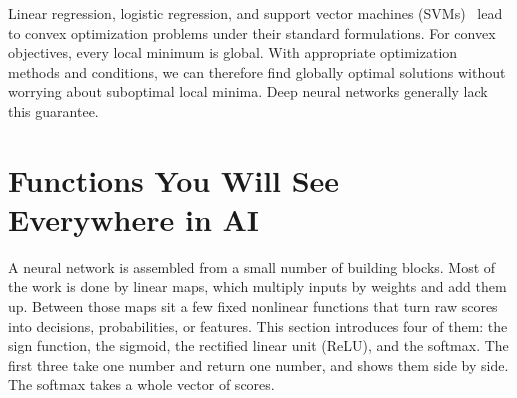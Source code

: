 \begin{aibox}
  Linear regression, logistic regression, and support vector machines
  (SVMs)~\cite{cortes1995svm} lead to convex optimization problems under
  their standard formulations. For convex objectives, every local minimum
  is global. With appropriate optimization methods and conditions, we can
  therefore find globally optimal solutions without worrying about
  suboptimal local minima. Deep neural networks generally lack this
  guarantee.
\end{aibox}

\section{Functions You Will See Everywhere in AI}
\label{sec:ch01-ai-functions}

A neural network is assembled from a small number of building blocks.
Most of the work is done by linear maps, which multiply inputs by weights
and add them up. Between those maps sit a few fixed nonlinear functions
that turn raw scores into decisions, probabilities, or features. This
section introduces four of them: the sign function, the sigmoid, the
rectified linear unit (ReLU), and the softmax. The first three take one
number and return one number, and  shows them
side by side. The softmax takes a whole vector of scores.

